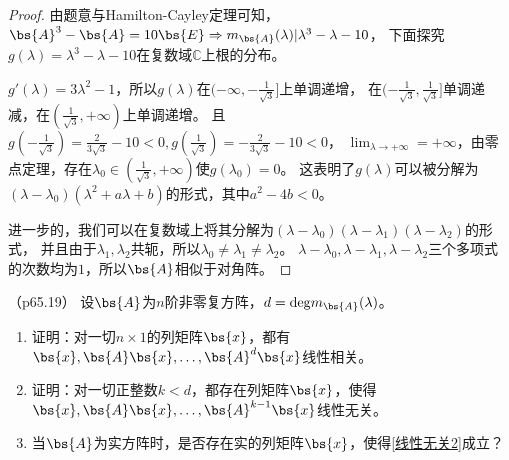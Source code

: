 \documentclass[12pt, a4paper, oneside, UTF8]{ctexbook}
\begin{document}
\begin{proof}
    由题意与Hamilton-Cayley定理可知，$\bs{A}^3-\bs{A}=10\bs{E} \Rightarrow m_{\bs{A}}(\lambda)|\lambda^3-\lambda-10$，
    下面探究$g(\lambda)=\lambda^3-\lambda-10$在复数域$\mathbb{C}$上根的分布。

    $g'(\lambda)=3\lambda^2-1$，所以$g(\lambda)$在$(-\infty,-\frac{1}{\sqrt{3}}]$上单调递增，
    在$(-\frac{1}{\sqrt{3}},\frac{1}{\sqrt{3}}]$单调递减，在$(\frac{1}{\sqrt{3}},+\infty)$上单调递增。
    且$g(-\frac{1}{\sqrt{3}})=\frac{2}{3\sqrt{3}}-10<0,g(\frac{1}{\sqrt{3}})=-\frac{2}{3\sqrt{3}}-10<0$，
    $\lim_{\lambda \to +\infty}=+\infty$，由零点定理，存在$\lambda_0 \in (\frac{1}{\sqrt{3}},+\infty)$使$g(\lambda_0)=0$。
    这表明了$g(\lambda)$可以被分解为$(\lambda-\lambda_0)(\lambda^2+a\lambda+b)$的形式，其中$a^2-4b <0$。
    
    进一步的，我们可以在复数域上将其分解为$(\lambda-\lambda_0)(\lambda-\lambda_1)(\lambda-\lambda_2)$的形式，
    并且由于$\lambda_1,\lambda_2$共轭，所以$\lambda_0\neq\lambda_1 \neq \lambda_2$。
    $\lambda-\lambda_0,\lambda-\lambda_1,\lambda-\lambda_2$三个多项式的次数均为$1$，所以$\bs{A}$相似于对角阵。

\end{proof}

\begin{question}（p65.19）
    设$\bs{A}$为$n$阶非零复方阵，$d=\mathrm{deg}m_{\bs{A}}(\lambda)$。
    \begin{enumerate}[label=(\arabic*)]
        \item 证明：对一切$n \times 1$的列矩阵$\bs{x}$，都有$\bs{x},\bs{A}\bs{x},\ldots,\bs{A}^{d}\bs{x}$线性相关。
        \item 证明：对一切正整数$k<d$，都存在列矩阵$\bs{x}$，使得$\bs{x},\bs{A}\bs{x},\ldots,\bs{A}^{k-1}\bs{x}$线性无关。\label{线性无关2}
        \item 当$\bs{A}$为实方阵时，是否存在实的列矩阵$\bs{x}$，使得\ref{线性无关2}成立？
    \end{enumerate}
\end{question}
\end{document}
